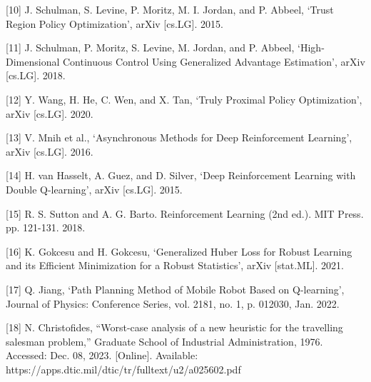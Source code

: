 \documentclass{article}
\begin{document}
	[10] J. Schulman, S. Levine, P. Moritz, M. I. Jordan, and P. Abbeel, ‘Trust Region Policy Optimization’, arXiv [cs.LG]. 2015.
	
	[11] J. Schulman, P. Moritz, S. Levine, M. Jordan, and P. Abbeel, ‘High-Dimensional Continuous Control Using Generalized Advantage Estimation’, arXiv [cs.LG]. 2018.
	
	[12] Y. Wang, H. He, C. Wen, and X. Tan, ‘Truly Proximal Policy Optimization’, arXiv [cs.LG]. 2020.
	
	[13] V. Mnih et al., ‘Asynchronous Methods for Deep Reinforcement Learning’, arXiv [cs.LG]. 2016.
	
	[14] H. van Hasselt, A. Guez, and D. Silver, ‘Deep Reinforcement Learning with Double Q-learning’, arXiv [cs.LG]. 2015.
	
	[15] R. S. Sutton and A. G. Barto. Reinforcement Learning (2nd ed.). MIT Press. pp. 121-131. 2018.
	
	[16] K. Gokcesu and H. Gokcesu, ‘Generalized Huber Loss for Robust Learning and its Efficient Minimization for a Robust Statistics’, arXiv [stat.ML]. 2021.
	
	[17] Q. Jiang, ‘Path Planning Method of Mobile Robot Based on Q-learning’, Journal of Physics: Conference Series, vol. 2181, no. 1, p. 012030, Jan. 2022.
	
	[18] N. Christofides, “Worst-case analysis of a new heuristic for the travelling salesman problem,” Graduate School of Industrial Administration, 1976. Accessed: Dec. 08, 2023. [Online]. Available: https://apps.dtic.mil/dtic/tr/fulltext/u2/a025602.pdf
	
\end{document}

